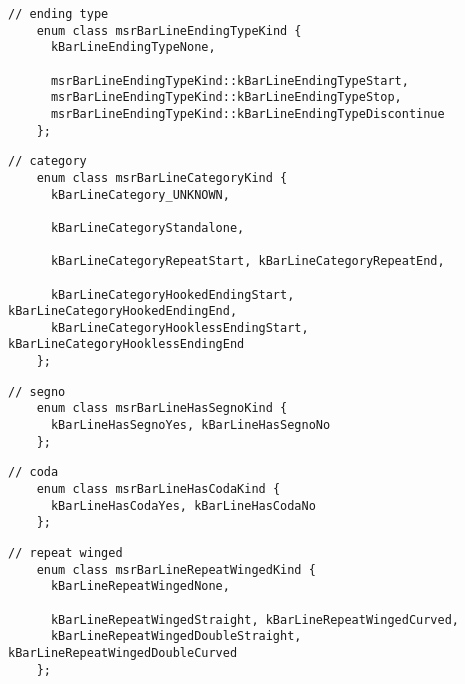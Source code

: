 \begin{lstlisting}[language=CPlusPlus]
    // ending type
    enum class msrBarLineEndingTypeKind {
      kBarLineEndingTypeNone,

      msrBarLineEndingTypeKind::kBarLineEndingTypeStart,
      msrBarLineEndingTypeKind::kBarLineEndingTypeStop,
      msrBarLineEndingTypeKind::kBarLineEndingTypeDiscontinue
    };
\end{lstlisting}

\begin{lstlisting}[language=CPlusPlus]
    // category
    enum class msrBarLineCategoryKind {
      kBarLineCategory_UNKNOWN,

      kBarLineCategoryStandalone,

      kBarLineCategoryRepeatStart, kBarLineCategoryRepeatEnd,

      kBarLineCategoryHookedEndingStart, kBarLineCategoryHookedEndingEnd,
      kBarLineCategoryHooklessEndingStart, kBarLineCategoryHooklessEndingEnd
    };
\end{lstlisting}

\begin{lstlisting}[language=CPlusPlus]
    // segno
    enum class msrBarLineHasSegnoKind {
      kBarLineHasSegnoYes, kBarLineHasSegnoNo
    };
\end{lstlisting}

\begin{lstlisting}[language=CPlusPlus]
    // coda
    enum class msrBarLineHasCodaKind {
      kBarLineHasCodaYes, kBarLineHasCodaNo
    };

\end{lstlisting}

\begin{lstlisting}[language=CPlusPlus]
    // repeat winged
    enum class msrBarLineRepeatWingedKind {
      kBarLineRepeatWingedNone,

      kBarLineRepeatWingedStraight, kBarLineRepeatWingedCurved,
      kBarLineRepeatWingedDoubleStraight, kBarLineRepeatWingedDoubleCurved
    };
\end{lstlisting}

